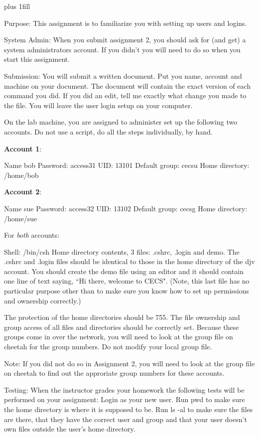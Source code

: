
\rightskip=0pt plus 1fill

\parindent 0pt

Purpose: This assignment is to familiarize you with setting up users and logins.

System Admin: When you submit assignment 2, you should ask for (and get)
a system administrators account. If you didn't you will need to do so
when you start this assignment.

Submission: You will submit a written document.
Put you name, account and machine on your document.
The document will contain the exact version of each command you did.
If you did an edit, tell me exactly what change you made to the file. 
You will leave the user login setup on your computer.

On the lab machine, you are assigned to administer set up the
following two accounts.
Do not use a script, do all the steps individually, by hand.

{\bf Account 1}:

Name {\ltt{}bob}
\break
Password: access31
\break
UID: {\ltt{}13101}
\break
Default group: {\ltt{}cecsu}
\break
Home directory: {\ltt{}/home/bob}

{\bf Account 2}:

Name {\ltt{}sue}
\break
Password: access32
\break
UID: {\ltt{}13102}
\break
Default group: {\ltt{}cecsg}
\break
Home directory: {\ltt{}/home/sue}

For {\it both} accounts:

Shell: {\ltt{}/bin/csh}
\break
Home directory contents, 3 files:
{\ltt{}.cshrc}, {\ltt{}.login} and {\ltt{}demo}.
\break
The {\ltt{}.cshrc} and {\ltt{}.login} files should be identical to those in
the home directory of the {\ltt{}djv} account.
You should create the {\ltt{}demo} file using an editor
and it should contain one line of text saying,
``Hi there, welcome to CECS". 
(Note, this last file has no particular purpose other than
to make sure you know how to set up permissions and ownership correctly.)

The protection of the home directories should be 755.
The file ownership and group access of all files and directories
should be correctly set.
Because these groups come in over the network,
you will need to look at the {\ltt{}group} file on {\ltt{}cheetah}
for the group numbers.
Do not modify your local {\ltt{}group} file.

Note:
If you did not do so in Assignment 2,
you will need to look at the group file on cheetah to find out
the approriate group numbers for these accounts.

Testing:
\break
When the instructor grades your homework the following tests will be
performed on your assignment:
Login as your new user. Run {\ltt{}pwd} to make sure the home directory
is where it is supposed to be.
Run {\ltt{}ls -al} to make sure the files are there, that they have
the correct user and group and that your user doesn't own files
outside the user's home directory.
\bye
